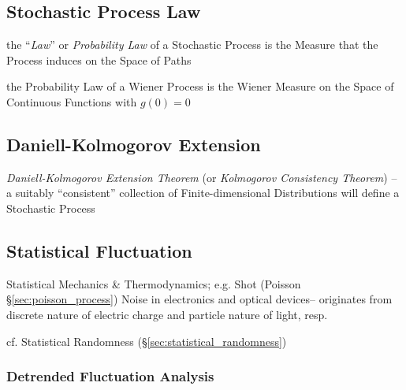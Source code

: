 \subsection{Stochastic Process Law}\label{sec:process_law}

the ``\emph{Law}'' or \emph{Probability Law} of a Stochastic Process is the
Measure that the Process induces on the Space of Paths

the Probability Law of a Wiener Process is the Wiener Measure on the Space of
Continuous Functions with $g(0) = 0$



\subsection{Daniell-Kolmogorov Extension}\label{sec:kolmogorov_extension}

\emph{Daniell-Kolmogorov Extension Theorem} (or \emph{Kolmogorov Consistency
  Theorem}) -- a suitably ``consistent'' collection of Finite-dimensional
Distributions will define a Stochastic Process



\subsection{Statistical Fluctuation}\label{sec:statistical_fluctuation}

Statistical Mechanics \& Thermodynamics; e.g. Shot (Poisson
\S\ref{sec:poisson_process}) Noise in electronics and optical devices--
originates from discrete nature of electric charge and particle nature of light,
resp.

cf. Statistical Randomness (\S\ref{sec:statistical_randomness})



\subsubsection{Detrended Fluctuation Analysis}\label{sec:detrended_fluctuation}

